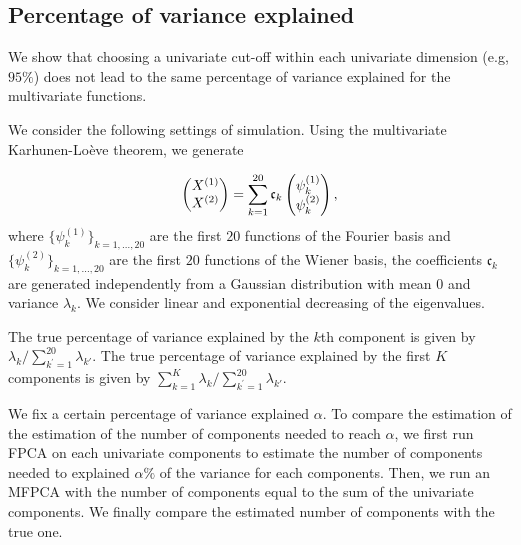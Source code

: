 


\subsection{Percentage of variance explained} %
\label{sub:percentage_of_variance_explained}

We show that choosing a univariate cut-off within each univariate dimension (e.g, $95\%$) does not lead to the same percentage of variance explained for the multivariate functions.

We consider the following settings of simulation. Using the multivariate Karhunen-Loève theorem, we generate

\begin{equation}\label{eq:simu_var_explained}
\begin{pmatrix} X^{(1)} \\ X^{(2)} \end{pmatrix} = \sum_{k = 1}^{20} \mathfrak{c}_k \begin{pmatrix} \psi_k^{(1)} \\ \psi_k^{(2)} \end{pmatrix},
\end{equation}
where $\{\psi_k^{(1)}\}_{k = 1, \dots, 20}$ are the first $20$ functions of the Fourier basis and $\{\psi_k^{(2)}\}_{k = 1, \dots, 20}$ are the first $20$ functions of the Wiener basis, the coefficients $\mathfrak{c}_k$ are generated independently from a Gaussian distribution with mean $0$ and variance $\lambda_k$. We consider linear and exponential decreasing of the eigenvalues.

The true percentage of variance explained by the $k$th component is given by
$\lambda_k / \sum_{k^\prime = 1}^{20} \lambda_{k\prime}$. The true percentage of variance explained by the first $K$ components is given by $\sum_{k = 1}^K \lambda_k / \sum_{k^\prime = 1}^{20} \lambda_{k\prime}$.

We fix a certain percentage of variance explained $\alpha$. To compare the estimation of the estimation of the number of components needed to reach $\alpha$, we first run FPCA on each univariate components to estimate the number of components needed to explained $\alpha\%$ of the variance for each components. Then, we run an MFPCA with the number of components equal to the sum of the univariate components. We finally compare the estimated number of components with the true one.

